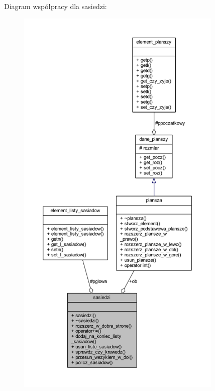 Diagram współpracy dla sasiedzi\+:
\nopagebreak
\begin{figure}[H]
\begin{center}
\leavevmode
\includegraphics[height=550pt]{classsasiedzi__coll__graph}
\end{center}
\end{figure}
